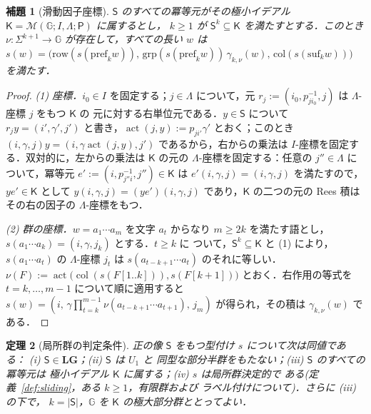 \documentclass[11pt,a4paper]{ltjsarticle}
\numberwithin{equation}{section}
\theoremstyle{plain}
\newtheorem{theorem}{定理}[section]
\newtheorem{lemma}[theorem]{補題}
\theoremstyle{definition}
\theoremstyle{remark}
\theoremstyle{plain}
\newcommand{\LG}{\mathbf{LG}}
\begin{document}
\begin{lemma}[滑動因子座標]
\label{lem:rees}
$\mathsf S$ のすべての冪等元がその極小イデアル
$\mathsf K=\mathcal M(\mathbb G;I,\Lambda;\mathsf P)$ に属するとし，
$k\ge1$ が $\mathsf S^k\subseteq\mathsf K$ を満たすとする．このとき
$\nu:\Sigma^{k+1}\to\mathbb G$ が存在して，すべての長い $w$ は
$s(w)=\bigl(\mathrm{row}(s(\mathrm{pref}_kw)),\,\mathrm{grp}(s(\mathrm{pref}_kw))\,\gamma_{k,\nu}(w),\,
\mathrm{col}(s(\mathrm{suf}_kw))\bigr)$ を満たす．
\end{lemma}

\begin{proof}
\emph{(1) 座標．}$i_0\in I$ を固定する；$j\in\Lambda$ について，元
$r_j:=(i_0,p_{ji_0}^{-1},j)$ は $\Lambda$-座標 $j$ をもつ $\mathsf K$ の
元に対する右単位元である．$y\in \mathsf S$ について
$r_jy=(i',\gamma',j')$ と書き，$\operatorname{act}(j,y):=p_{ji'}\gamma'$
とおく；このとき $(i,\gamma,j)y=(i,\gamma\operatorname{act}(j,y),j')$
であるから，右からの乗法は $I$-座標を固定する．双対的に，左からの乗法は
$\mathsf K$ の元の $\Lambda$-座標を固定する：任意の $j''\in\Lambda$ に
ついて，冪等元 $e':=(i,p_{j''i}^{-1},j'')\in\mathsf K$ は
$e'(i,\gamma,j)=(i,\gamma,j)$ を満たすので，$ye'\in\mathsf K$ として
$y(i,\gamma,j)=(ye')(i,\gamma,j)$ であり，$\mathsf K$ の二つの元の
Rees 積はその右の因子の $\Lambda$-座標をもつ．

\emph{(2) 群の座標．}$w=a_1\cdots a_m$ を文字 $a_t$ からなり $m\ge2k$
を満たす語とし，$s(a_1\cdots a_k)=(i,\gamma,j_k)$ とする．$t\ge k$ に
ついて，$\mathsf S^k\subseteq\mathsf K$ と (1) により，$s(a_1\cdots a_t)$
の $\Lambda$-座標 $j_t$ は $s(a_{t-k+1}\cdots a_t)$ のそれに等しい．
$\nu(F):=\operatorname{act}\bigl(\operatorname{col}(s(F[1..k])),s(F[k+1])\bigr)$
とおく．右作用の等式を $t=k,\ldots,m-1$ について順に適用すると
$s(w)=(i,\,\gamma\prod_{t=k}^{m-1}\nu(a_{t-k+1}\cdots a_{t+1}),\,j_m)$
が得られ，その積は $\gamma_{k,\nu}(w)$ である．
\end{proof}

\begin{theorem}[局所群の判定条件]
\label{thm:lg-characterization}
正の像 $\mathsf S$ をもつ型付け $s$ について次は同値である：
\textup{(i)} $\mathsf S\in\LG$；\textup{(ii)} $\mathsf S$ は $U_1$ と
同型な部分半群をもたない；\textup{(iii)} $\mathsf S$ のすべての冪等元は
極小イデアル $\mathsf K$ に属する；\textup{(iv)} $s$ は局所群決定的で
ある\textup(定義~\ref{def:sliding}，ある $k\ge1$，有限群および
ラベル付けについて\textup)．さらに \textup{(iii)} の下で，
$k=|\mathsf S|$，$\mathbb G$ を $\mathsf K$ の極大部分群ととってよい．
\end{theorem}
\end{document}
